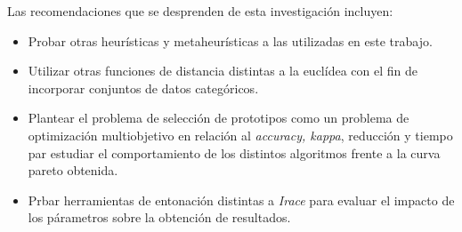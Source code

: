 Las recomendaciones que se desprenden de esta investigación incluyen: 

\begin{itemize}

\item Probar otras heurísticas y metaheurísticas a las utilizadas en este trabajo.

\item Utilizar otras funciones de distancia distintas a la euclídea con el fin de incorporar conjuntos de datos categóricos.

\item Plantear el problema de selección de prototipos como un problema de optimización multiobjetivo en relación al \emph{accuracy, kappa}, reducción y tiempo par estudiar el comportamiento de los distintos algoritmos frente a la curva pareto obtenida.

\item Prbar herramientas de entonación distintas a \emph{Irace} para evaluar el impacto de los párametros sobre la obtención de resultados.

\end{itemize}

